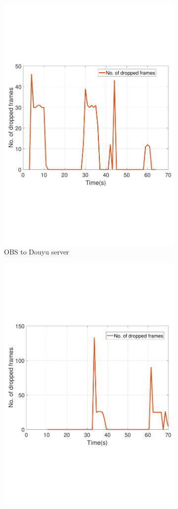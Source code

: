 \begin{figure}[htb]
\begin{subfigure}[b]{0.32\textwidth}
  \includegraphics[width=0.8\linewidth]{fig/obs_douyu_drop.pdf}
  \caption{OBS to Douyu server}
  \label{fig:obs-douyu-drop}
\end{subfigure}
\begin{subfigure}[b]{0.32\textwidth}
  \includegraphics[width=0.8\linewidth]{fig/douyu_drop.pdf}

\end{subfigure}
\end{figure}
